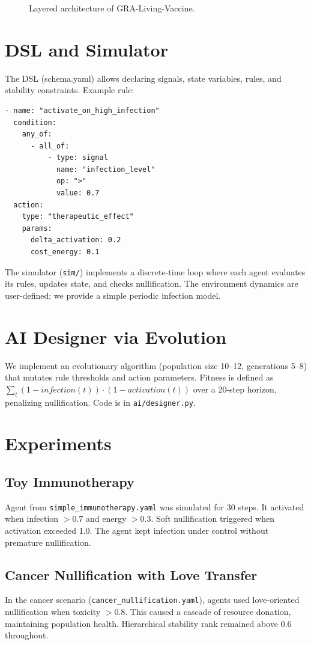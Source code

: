 \documentclass[12pt,a4paper]{article}
\begin{document}
\begin{figure}[h]
\centering
{}
\caption{Layered architecture of GRA-Living-Vaccine.}
\label{fig:layers}
\end{figure}

\section{DSL and Simulator}
The DSL (schema.yaml) allows declaring signals, state variables, rules, and stability constraints. Example rule:
\begin{verbatim}
- name: "activate_on_high_infection"
  condition:
    any_of:
      - all_of:
          - type: signal
            name: "infection_level"
            op: ">"
            value: 0.7
  action:
    type: "therapeutic_effect"
    params:
      delta_activation: 0.2
      cost_energy: 0.1
\end{verbatim}
The simulator (\texttt{sim/}) implements a discrete-time loop where each agent evaluates its rules, updates state, and checks nullification. The environment dynamics are user-defined; we provide a simple periodic infection model.

\section{AI Designer via Evolution}
We implement an evolutionary algorithm (population size 10--12, generations 5--8) that mutates rule thresholds and action parameters. Fitness is defined as $ \sum_t (1 - infection(t)) \cdot (1 - activation(t)) $ over a 20-step horizon, penalizing nullification. Code is in \texttt{ai/designer.py}.

\section{Experiments}
\subsection{Toy Immunotherapy}
Agent from \texttt{simple\_immunotherapy.yaml} was simulated for 30 steps. It activated when infection $>0.7$ and energy $>0.3$. Soft nullification triggered when activation exceeded 1.0. The agent kept infection under control without premature nullification.

\subsection{Cancer Nullification with Love Transfer}
In the cancer scenario (\texttt{cancer\_nullification.yaml}), agents used love-oriented nullification when toxicity $>0.8$. This caused a cascade of resource donation, maintaining population health. Hierarchical stability rank remained above 0.6 throughout.
\end{document}
